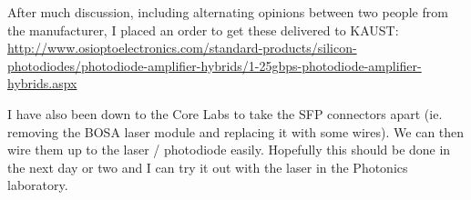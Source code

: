 After much discussion, including alternating opinions between two
people from the manufacturer, I placed an order to get these delivered
to KAUST:
\url{http://www.osioptoelectronics.com/standard-products/silicon-photodiodes/photodiode-amplifier-hybrids/1-25gbps-photodiode-amplifier-hybrids.aspx}

I have also been down to the Core Labs to take the SFP
connectors apart (ie. removing the \ac{BOSA} laser module
and replacing it with some wires). We can then wire them
up to the laser / photodiode easily. Hopefully this should
be done in the next day or two and I can try it out with
the laser in the Photonics laboratory.